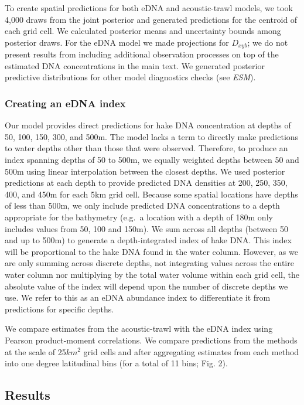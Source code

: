 \documentclass[
]{article}
\begin{document}
To create spatial predictions for both eDNA and acoustic-trawl models,
we took 4,000 draws from the joint posterior and generated predictions
for the centroid of each grid cell. We calculated posterior means and
uncertainty bounds among posterior draws. For the eDNA model we made
projections for \(D_{xyb}\); we do not present results from including
additional observation processes on top of the estimated DNA
concentrations in the main text. We generated posterior predictive distributions for
other model diagnostics checks (see \textit{ESM}).

\hypertarget{creating-an-edna-index}{%
\subsubsection{Creating an eDNA index}\label{creating-an-edna-index}}

Our model provides direct predictions for hake DNA concentration at
depths of 50, 100, 150, 300, and 500m. The model lacks a term to directly
make predictions to water depths other than those that were observed. 
Therefore, to produce an index spanning depths of 50 to 500m, we equally 
weighted depths between 50 and 500m using linear interpolation between 
the closest depths. We used posterior predictions
at each depth to provide predicted DNA densities at 200, 250, 350, 400,
and 450m for each 5km grid cell. Because some spatial locations have depths of
less than 500m, we only include predicted DNA concentrations to a depth
appropriate for the bathymetry (e.g.~a location with a depth of 180m
only includes values from 50, 100 and 150m). We sum across all depths
(between 50 and up to 500m) to generate a depth-integrated index of hake
DNA. This index will be proportional to the hake DNA found in the water
column. However, as we are only summing across discrete depths, not
integrating values across the entire water column nor multiplying by the
total water volume within each grid cell, the absolute value of the
index will depend upon the number of discrete depths we use. We
refer to this as an eDNA abundance index to differentiate it from predictions for specific depths.

We compare estimates from the acoustic-trawl with the eDNA index using Pearson 
product-moment correlations.  We compare predictions from the methods at the 
scale of 25\(km^2\) grid cells and after aggregating estimates from each method 
into one degree latitudinal bins (for a total of 11 bins; Fig. 2).

\hypertarget{results}{%
\subsection{Results}\label{results}}
\end{document}

